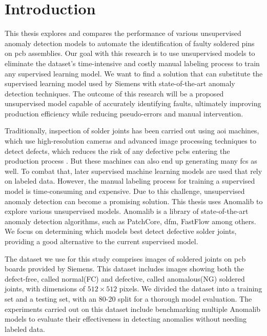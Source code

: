 \chapter{Introduction}
\label{sec:introduction}

This thesis explores and compares the performance of various unsupervised anomaly detection models to automate the identification of faulty soldered pins on \gls{pcb} assemblies. Our goal with this research is to use unsupervised models to eliminate the dataset's time-intensive and costly manual labeling process to train any supervised learning model. We want to find a solution that can substitute the supervised learning model used by Siemens with state-of-the-art anomaly detection techniques. The outcome of this research will be a proposed unsupervised model capable of accurately identifying faults, ultimately improving production efficiency while reducing pseudo-errors and manual intervention.

Traditionally, inspection of solder joints has been carried out using \gls{aoi} machines, which use high-resolution cameras and advanced image processing techniques to detect defects, which reduces the risk of any defective \glspl{pcb} entering the production process \cite{yingxing2024}. But these machines can also end up generating many \glspl{fc} as well. To combat that, later supervised machine learning models are used that rely on labeled data. However, the manual labeling process for training a supervised model is time-consuming and expensive. Due to this challenge, unsupervised anomaly detection can become a promising solution. This thesis uses Anomalib\cite{Anomalib2024} to explore various unsupervised models. Anomalib is a library of state-of-the-art anomaly detection algorithms, such as PatchCore\cite{roth2022totalrecallindustrialanomaly}, \gls{dfm}\cite{ahuja2019probabilisticmodelingdeepfeatures}, FastFlow\cite{yu2021fastflowunsupervisedanomalydetection} among others. We focus on determining which models best detect defective solder joints, providing a good alternative to the current supervised model. %

The dataset we use for this study comprises images of soldered joints on \gls{pcb} boards provided by Siemens. This dataset includes images showing both the defect-free, called normal(FC) and defective, called anomalous(NG) soldered joints, with dimensions of $512\times512$ pixels. We divided the dataset into a training set and a testing set, with an 80-20 split for a thorough model evaluation. The experiments carried out on this dataset include benchmarking multiple Anomalib models to evaluate their effectiveness in detecting anomalies without needing labeled data.

